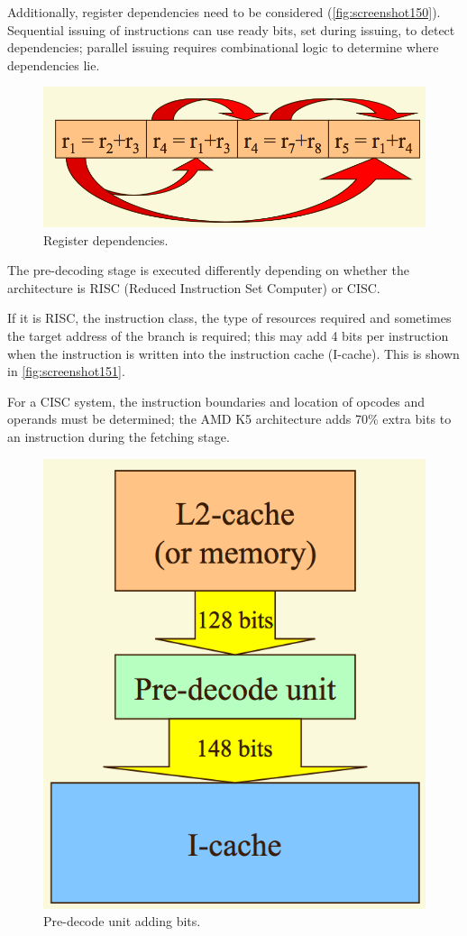 Additionally, register dependencies need to be considered (\autoref{fig:screenshot150}). Sequential issuing of instructions can use ready bits, set during issuing, to detect dependencies; parallel issuing requires combinational logic to determine where dependencies lie.

\begin{figure}
\centering
\includegraphics[width=0.7\linewidth]{figures/screenshot150}
\caption{Register dependencies.}
\label{fig:screenshot150}
\end{figure}

The pre-decoding stage is executed differently depending on whether the architecture is RISC (Reduced Instruction Set Computer) or CISC. 

If it is RISC, the instruction class, the type of resources required and sometimes the target address of the branch is required; this may add 4 bits per instruction when the instruction is written into the instruction cache (I-cache). This is shown in \autoref{fig:screenshot151}.

For a CISC system, the instruction boundaries and location of opcodes and operands must be determined; the AMD K5 architecture adds 70\% extra bits to an instruction during the fetching stage.

\begin{figure}
\centering
\includegraphics[width=0.7\linewidth]{figures/screenshot151}
\caption{Pre-decode unit adding bits.}
\label{fig:screenshot151}
\end{figure}


